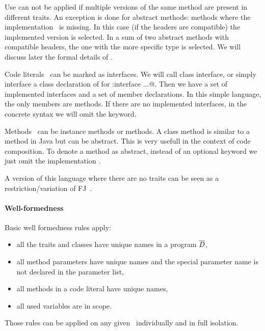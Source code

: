 Use can not be applied if multiple versions of the same method are
present in different traits.  An exception is done for abstract methods:
methods where the implementation \me\ is missing. In this case (if the
headers are compatible) the implemented version is selected.  In a sum
of two abstract methods with compatible headers, the one with the more
specific type is selected. We will discuss later the formal details of
\use.

Code literals \mL\ can be marked as interfaces.  We will call class
interface, or simply interface a class declaration of for \Q@C:{interface  ...}@.
  Then we have a set of implemented interfaces and a set of member
  declarations. In this simple language, the only members are methods.
If there are no implemented interfaces, in the concrete syntax we will omit the \Q@implements@ keyword.

Methods \mMD~can be instance methods or \Q@class@ methods. A class method is similar to a \Q@static@ method in Java but can be abstract. This is very usefull in the context of code composition.
To denote a method as abstract, instead of an optional keyword we just omit the implementation \me.

A version of this language where there are no traits can be seen 
as a restriction/variation of FJ~\cite{igarashi2001featherweight}.

\paragraph{Well-formedness}
Basic well formedness rules apply:
\begin{itemize}
\item all the traits and classes have unique names in a program $\overline{\mathit{D}}$,
\item all method parameters have unique names and the special parameter name \Q@this@ is not declared
 in the parameter list,
\item all methods in a code literal have unique names,
\item all used variables are in scope.
\end{itemize}
Those rules can be applied on any given \mL~individually and in full isolation.

